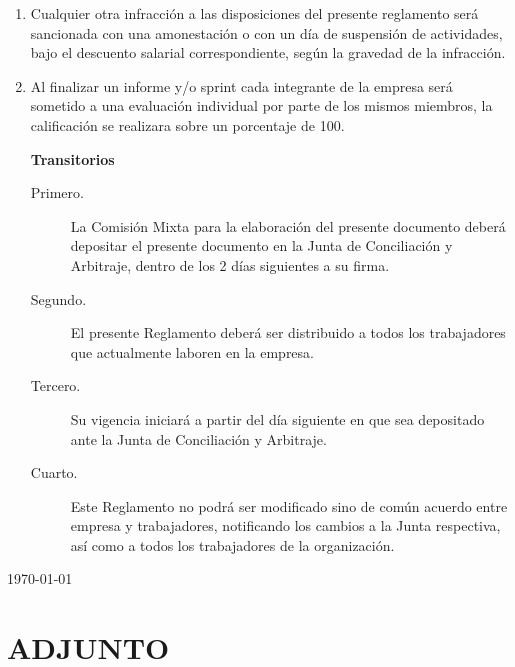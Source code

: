 \documentclass[11pt,letterpaper]{report}
\begin{document}
\begin{enumerate}
\item Cualquier otra infracción a las disposiciones del presente reglamento será sancionada con una amonestación o con un día de suspensión de actividades, bajo el descuento salarial correspondiente, según la gravedad de la infracción.
\item Al finalizar un informe y/o sprint cada integrante de la empresa será sometido a una evaluación individual por parte de los mismos miembros, la calificación se realizara sobre un porcentaje de 100.
\begin{center}
{\bf Transitorios}
\end{center}
\begin{description}
\item[Primero.] La Comisión Mixta para la elaboración del presente documento deberá depositar el presente documento en la Junta de Conciliación y Arbitraje, dentro de los 2 días siguientes a su firma.
\item[Segundo.] El presente Reglamento deberá ser distribuido a todos los trabajadores que actualmente laboren en la empresa.
\item[Tercero.] Su vigencia iniciará a partir del día siguiente en que sea depositado ante la Junta de Conciliación y Arbitraje.
\item[Cuarto.] Este Reglamento no podrá ser modificado sino de común acuerdo entre empresa y trabajadores, notificando los cambios a la Junta respectiva, así como a todos los trabajadores de la organización.
\end{description}
\end{enumerate}
\begin{flushright}
\today
\end{flushright}


\chapter{ADJUNTO}

\newpage
\end{document}
